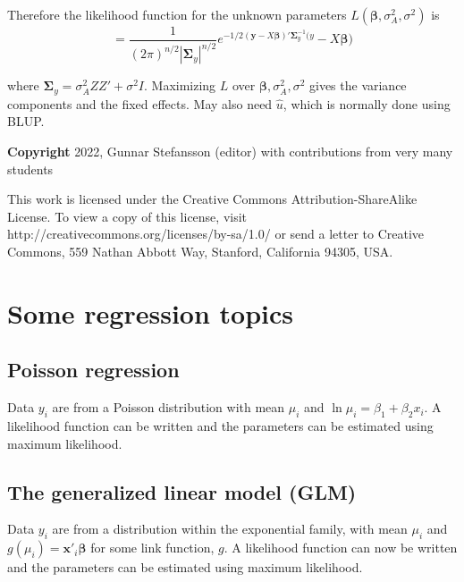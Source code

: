 \documentclass[12pt,a4paper]{article}
\theoremstyle{regla}
\theoremstyle{remark}
\theoremstyle{definition}
\theoremstyle{nonumberbreak}
\begin{document}
Therefore the likelihood function for the unknown parameters $L(\boldsymbol{\beta},\sigma^2_A, \sigma^2)$ is
$$ = \frac{1}{(2\pi)^{n/2} \left| \boldsymbol{\Sigma}_y \right| ^{n/2}} e^{-1/2 (\mathbf{y}-X\boldsymbol{\beta})' \boldsymbol{\Sigma}^{-1}_y (y}-X\boldsymbol{\beta})$$

where $\boldsymbol{\Sigma}_y =  \sigma^2_A Z Z' + \sigma^2 I$. Maximizing $L$ over $\boldsymbol{\beta},\sigma^2_A, \sigma^2$ gives the variance components and the fixed effects. May also need $\hat{u}$, which is normally done using BLUP.


{\bf Copyright}
2022, Gunnar Stefansson (editor) with contributions from very many students

This work is licensed under the Creative Commons
Attribution-ShareAlike License. To view a copy of this license, visit
http://creativecommons.org/licenses/by-sa/1.0/ or send a letter to
Creative Commons, 559 Nathan Abbott Way, Stanford, California 94305,
USA.
\clearpage
\section{Some regression topics}
\subsection{Poisson regression}
\begin{fbox}
\begin{minipage}{0.97\textwidth}
Data $y_i$ are from a Poisson distribution with mean $\mu_i$ and $\ln{\mu_i}=\beta_1+\beta_2 x_i$. A likelihood function can be written and the parameters can be estimated using maximum likelihood.



\end{minipage}
\end{fbox}

\subsection{The generalized linear model (GLM)}
\begin{fbox}
\begin{minipage}{0.97\textwidth}
Data $y_i$ are from a distribution within the exponential family, with mean $\mu_i$ and $g(\mu_i)=\textbf{x}'_i\boldsymbol{\beta}$ for some link function, $g$. A likelihood function can now be written and the parameters can be estimated using maximum likelihood.



\end{minipage}
\end{fbox}
\end{document}
